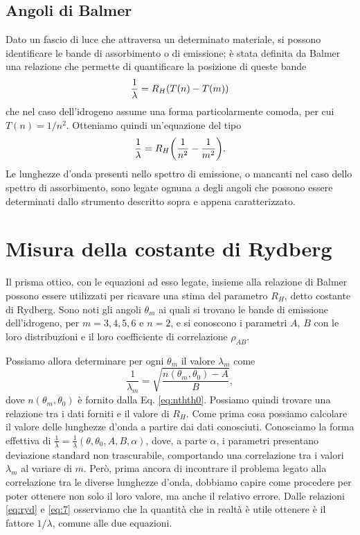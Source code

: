 \documentclass[a4paper,aps,12pt,tightenlines]{revtex4-2}
\begin{document}
\subsection{Angoli di Balmer}

Dato un fascio di luce che attraversa un determinato materiale, si possono identificare le bande di assorbimento o di emissione; è stata definita da Balmer una relazione che permette di quantificare la posizione di queste bande \begin{equation} \frac{1}{\lambda} = R_H \qty(T(n) - T(m)) \end{equation} che nel caso dell'idrogeno assume una forma particolarmente comoda, per cui $T(n) = 1/n^2$. Otteniamo quindi un'equazione del tipo \begin{equation} \frac{1}{\lambda} = R_H \qty(\frac{1}{n^2} - \frac{1}{m^2}). \label{eq:ryd}\end{equation} Le lunghezze d'onda presenti nello spettro di emissione, o mancanti nel caso dello spettro di assorbimento, sono legate ognuna a degli angoli che possono essere determinati dallo strumento descritto sopra e appena caratterizzato. 

\section{Misura della costante di Rydberg}

Il prisma ottico, con le equazioni ad esso legate, insieme alla relazione di Balmer possono essere utilizzati per ricavare una stima del parametro $R_H$, detto costante di Rydberg. Sono noti gli angoli $\theta_m$ ai quali si trovano le bande di emissione dell'idrogeno, per $m = 3, 4, 5, 6$ e $n=2$, e si conoscono i parametri $A$, $B$ con le loro distribuzioni e il loro coefficiente di correlazione $\rho_{AB}$.

Possiamo allora determinare per ogni $\theta_m$ il valore $\lambda_m$ come \begin{equation} \frac{1}{\lambda_m} =  \sqrt{\frac{n(\theta_m, \theta_0) - A}{B}}, \label{eq:7}\end{equation} dove $n(\theta_m, \theta_0)$ è fornito dalla Eq. \eqref{eq:nthth0}. 
Possiamo quindi trovare una relazione tra i dati forniti e il valore di $R_H$. 
Come prima cosa possiamo calcolare il valore delle lunghezze d'onda a partire dai dati conosciuti. Conosciamo la forma effettiva di $\frac{1}{\lambda} = \frac{1}{\lambda}(\theta, \theta_0, A, B, \alpha)$, dove, a parte $\alpha$, i parametri presentano deviazione standard non trascurabile, comportando una correlazione tra i valori $\lambda_m$ al variare di $m$. Però, prima ancora di incontrare il problema legato alla correlazione tra le diverse lunghezze d'onda, dobbiamo capire come procedere per poter ottenere non solo il loro valore, ma anche il relativo errore. Dalle relazioni \eqref{eq:ryd} e \eqref{eq:7} osserviamo che la quantità che in realtà è utile ottenere è il fattore $1/\lambda$, comune alle due equazioni. 
\end{document}
